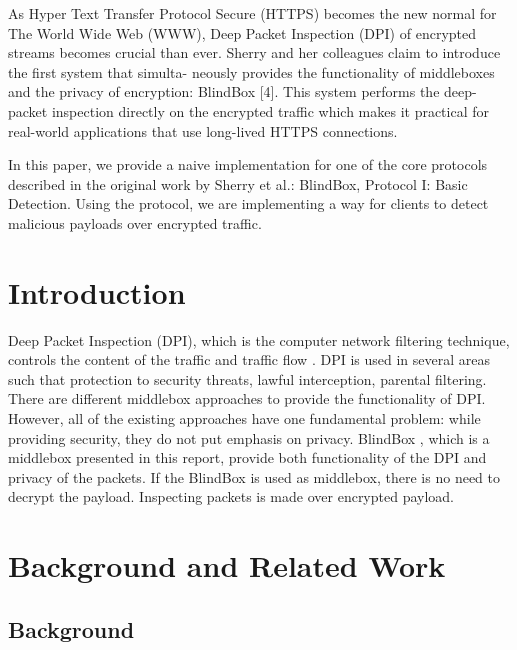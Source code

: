\documentclass{winslabreport}
\begin{document}
\renewcommand{\lstlistingname}{Code}
\renewcommand\lstlistlistingname{List of Code}
\restoregeometry
\maketitle

\summary
As Hyper Text Transfer Protocol Secure (HTTPS) becomes the new normal for The World Wide Web (WWW), Deep Packet Inspection (DPI) of encrypted streams becomes crucial than ever. Sherry and her colleagues claim to introduce the first system that simulta- neously provides the functionality of middleboxes and the privacy of encryption: BlindBox [4]. This system performs the deep-packet inspection directly on the encrypted traffic which makes it practical for real-world applications that use long-lived HTTPS connections.

In this paper, we provide a naive implementation for one of the core protocols described in the original work by Sherry et al.: BlindBox, Protocol I: Basic Detection. Using the protocol, we are implementing a way for clients to detect malicious payloads over encrypted traffic.

\tableofcontents
\addcontentsline{toc}{section}{\lstlistlistingname}
\lstlistoflistings
\listoffigures
\body

\section{Introduction}

Deep Packet Inspection (DPI), which is the computer network filtering technique, controls the content of the traffic and traffic flow \cite{Deep}. DPI is used in several areas such that protection to security threats, lawful interception, parental filtering. There are different middlebox approaches to provide the functionality of DPI. However, all of the existing approaches have one fundamental problem: while providing security, they do not put emphasis on privacy. BlindBox \cite{Blindbox}, which is a middlebox presented in this report, provide both functionality of the DPI and privacy of the packets. If the BlindBox is used as middlebox, there is no need to decrypt the payload. Inspecting packets is made over encrypted payload. 

\section{Background and Related Work}

\subsection{Background}
\end{document}

